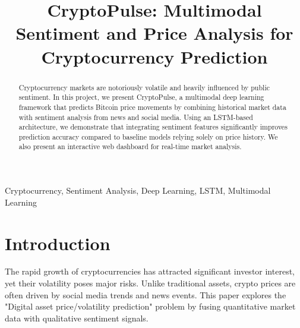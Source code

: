 \documentclass[conference]{IEEEtran}
\begin{document}
\title{CryptoPulse: Multimodal Sentiment and Price Analysis for Cryptocurrency Prediction}

\author{
\and
{}
\and
{}
\and
{}
}

\maketitle

\begin{abstract}
Cryptocurrency markets are notoriously volatile and heavily influenced by public sentiment. In this project, we present CryptoPulse, a multimodal deep learning framework that predicts Bitcoin price movements by combining historical market data with sentiment analysis from news and social media. Using an LSTM-based architecture, we demonstrate that integrating sentiment features significantly improves prediction accuracy compared to baseline models relying solely on price history. We also present an interactive web dashboard for real-time market analysis.
\end{abstract}

\begin{IEEEkeywords}
Cryptocurrency, Sentiment Analysis, Deep Learning, LSTM, Multimodal Learning
\end{IEEEkeywords}

\section{Introduction}
The rapid growth of cryptocurrencies has attracted significant investor interest, yet their volatility poses major risks. Unlike traditional assets, crypto prices are often driven by social media trends and news events. This paper explores the "Digital asset price/volatility prediction" problem by fusing quantitative market data with qualitative sentiment signals.
\end{document}
